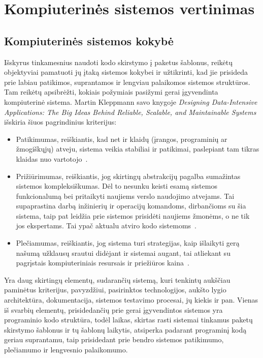 \section{Kompiuterinės sistemos vertinimas}
\subsection{Kompiuterinės sistemos kokybė}
Išskyrus tinkamesnius naudoti kodo skirstymo į paketus šablonus, reikėtų objektyviai pamatuoti jų įtaką sistemos kokybei ir užtikrinti,
 kad jie prisideda prie labiau patikimos, suprantamos ir lengviau palaikomos sistemos struktūros.
Tam reikėtų apsibrėžti, kokiais požymiais pasižymi gerai įgyvendinta kompiuterinė sistema.
Martin Kleppmann savo knygoje \textit{Designing Data-Intensive Applications: The Big Ideas Behind Reliable, Scalable, and Maintainable Systems}~\cite{DataIntensiveApplications} išskiria šiuos pagrindinius kriterijus:
\begin{itemize}
    \item Patikimumas, reiškiantis, kad net ir klaidų (įrangos, programinių ar žmogiškųjų) atveju,
    sistema veikia stabiliai ir patikimai, paslepiant tam tikras klaidas nuo vartotojo~\cite{DataIntensiveApplications}.
    \item Prižiūrimumas, reiškiantis, jog skirtingų abstrakcijų pagalba sumažintas sistemos kompleksiškumas.
    Dėl to nesunku keisti esamą sistemos funkcionalumą bei pritaikyti naujiems verslo naudojimo atvejams.
    Tai supaprastina darbą inžinierių ir operacijų komandoms, dirbančioms su šia sistema, taip pat leidžia prie sistemos prisidėti naujiems žmonėms, o ne
    tik jos ekspertams.
    Tai ypač aktualu atviro kodo sistemoms~\cite{DataIntensiveApplications}.
    \item Plečiamumas, reiškiantis, jog sistema turi strategijas, kaip išlaikyti gerą našumą užklausų
    srautui didėjant ir sistemai augant, tai atliekant su pagrįstais kompiuteriniais resursais ir
    priežiūros kaina~\cite{DataIntensiveApplications}.
\end{itemize}
Yra daug skirtingų elementų, sudarančių sistemą, kuri tenkintų aukščiau paminėtus kriterijus,
pavyzdžiui, pasirinktos technologijos, aukšto lygio architektūra, dokumentacija, sistemos testavimo
procesai, jų kiekis ir pan.
Vienas iš svarbių elementų, prisidedančių prie gerai įgyvendintos sistemos yra programinio kodo struktūra, todėl
laikas, skirtas rasti sistemai tinkamus paketų skirstymo šablonus ir tų šablonų laikytis, atsiperka padarant
programinį kodą geriau suprantamu, taip prisidedant prie bendro sistemos patikimumo, plečiamumo ir lengvesnio palaikomumo.

